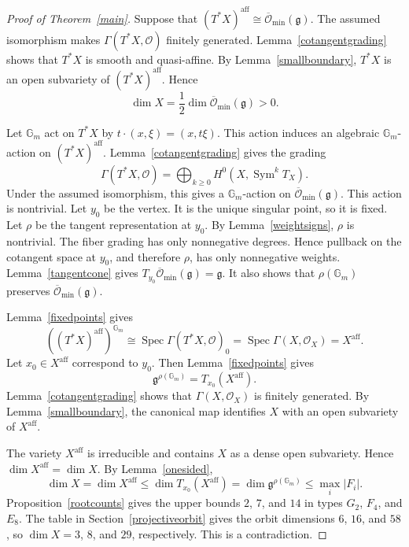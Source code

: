 \documentclass[12pt]{article}
\theoremstyle{definition}
\DeclareMathOperator{\Spec}{Spec}
\DeclareMathOperator{\Sym}{Sym}
\newcommand{\Gm}{\mathbb G_m}
\newcommand{\Lieg}{\mathfrak{g}}
\newcommand{\OO}{\mathcal O}
\newcommand{\Ominbar}{\overline{\mathcal O}_{\min}}
\newcommand{\aff}{\mathrm{aff}}
\begin{document}
\begin{proof}[Proof of Theorem~\ref{main}]
    Suppose that $(T^*X)^\aff\cong\Ominbar(\Lieg)$. The assumed isomorphism makes $\Gamma(T^*X,\OO)$ finitely generated. Lemma~\ref{cotangentgrading} shows that $T^*X$ is smooth and quasi-affine. By Lemma~\ref{smallboundary}, $T^*X$ is an open subvariety of $(T^*X)^\aff$. Hence
    \[
        \dim X=\frac12\dim\Ominbar(\Lieg)>0.
    \]

    Let $\Gm$ act on $T^*X$ by $t\cdot(x,\xi)=(x,t\xi)$. This action induces an algebraic $\Gm$-action on $(T^*X)^\aff$. Lemma~\ref{cotangentgrading} gives the grading
    \[
        \Gamma(T^*X,\OO)
        =\bigoplus_{k\ge0}H^0(X,\Sym^kT_X).
    \]
    Under the assumed isomorphism, this gives a $\Gm$-action on $\Ominbar(\Lieg)$. This action is nontrivial. Let $y_0$ be the vertex. It is the unique singular point, so it is fixed. Let $\rho$ be the tangent representation at $y_0$. By Lemma~\ref{weightsigns}, $\rho$ is nontrivial. The fiber grading has only nonnegative degrees. Hence pullback on the cotangent space at $y_0$, and therefore $\rho$, has only nonnegative weights. Lemma~\ref{tangentcone} gives $T_{y_0}\Ominbar(\Lieg)=\Lieg$. It also shows that $\rho(\Gm)$ preserves $\Ominbar(\Lieg)$.

    Lemma~\ref{fixedpoints} gives
    \[
        \left((T^*X)^\aff\right)^{\Gm}
        \cong\Spec\Gamma(T^*X,\OO)_0
        =\Spec\Gamma(X,\OO_X)
        =X^\aff.
    \]
    Let $x_0\in X^\aff$ correspond to $y_0$. Then Lemma~\ref{fixedpoints} gives
    \[
        \Lieg^{\rho(\Gm)}=T_{x_0}(X^\aff).
    \]
    Lemma~\ref{cotangentgrading} shows that $\Gamma(X,\OO_X)$ is finitely generated. By Lemma~\ref{smallboundary}, the canonical map identifies $X$ with an open subvariety of $X^\aff$.

    The variety $X^\aff$ is irreducible and contains $X$ as a dense open subvariety. Hence $\dim X^\aff=\dim X$. By Lemma~\ref{onesided},
    \[
        \dim X=\dim X^\aff
        \le\dim T_{x_0}(X^\aff)
        =\dim\Lieg^{\rho(\Gm)}\le\max_i|F_i|.
    \]
    Proposition~\ref{rootcounts} gives the upper bounds $2$, $7$, and $14$ in types $G_2$, $F_4$, and $E_8$. The table in Section~\ref{projectiveorbit} gives the orbit dimensions $6$, $16$, and $58$, so $\dim X=3$, $8$, and $29$, respectively. This is a contradiction.
\end{proof}
\end{document}
